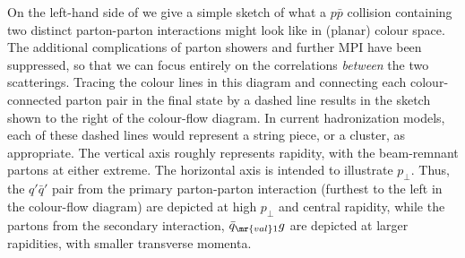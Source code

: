 On the left-hand side of
 we give a simple sketch of what a $p\bar{p}$
collision containing two distinct parton-parton interactions might
look like in (planar) colour space. The additional complications of parton
showers and further MPI have been suppressed, so
that we can focus entirely on the correlations \emph{between} the two
scatterings. Tracing the colour lines in this diagram and connecting
each colour-connected parton pair in the final state by a dashed line
results in the sketch shown to the right of the colour-flow
diagram. In current hadronization models, each of these dashed lines
would represent a string piece, or a cluster, as appropriate.
The vertical axis roughly represents rapidity, with the
beam-remnant partons at either extreme. The horizontal axis is
intended to illustrate $p_\perp$. Thus, the $q'\bar{q}'$ pair
from the primary parton-parton interaction
(furthest to the left in the colour-flow
diagram) are depicted at high $p_\perp$ and central rapidity, while the partons
from the secondary interaction, $\bar{q}_{\mr{val}1}g$
are depicted at larger rapidities, with
smaller transverse momenta.

